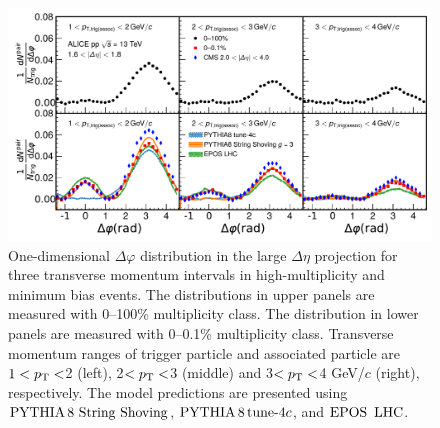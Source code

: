 \begin{figure}[h!]
	\centering
	\includegraphics[width=0.9\linewidth]{./figures/Fig2_PlotDeltaPhi.pdf}
	\caption{One-dimensional $\Delta\varphi$ distribution in the large $\Delta\eta$ projection for three transverse momentum intervals in high-multiplicity and minimum bias events. The distributions in upper panels are measured with 0--100\% multiplicity class. The distribution in lower panels are measured with 0--0.1\% multiplicity class. Transverse momentum ranges of trigger particle and associated particle are $1<p_\mathrm{T}<$2 (left), 2$<p_\mathrm{T}<$3 (middle) and 3$<p_\mathrm{T}<$4 GeV/$c$ (right), respectively. The model predictions are presented using ${\mathrm{PYTHIA}\,8~\mathrm{String}~}\mathrm{Shoving}$, $\mathrm{PYTHIA}\,8\,\mathrm{tune}{\text -}4c$, and ${\mathrm{EPOS}\,~\mathrm{LHC}}$.}
	\label{fig:PlotDeltaPhi}
\end{figure}
 
